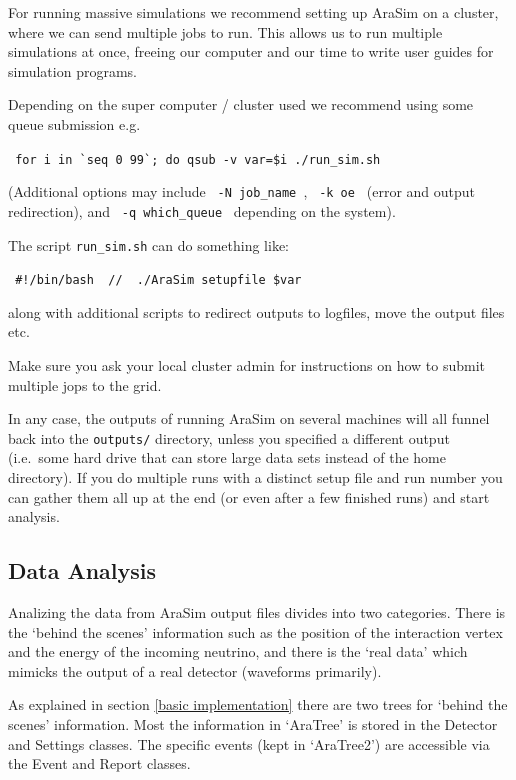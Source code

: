 \documentclass[a4paper,10pt]{article}
\newcommand{\room}{\vspace{0.3cm}}
\newcommand{\arasim}{AraSim\xspace}
\begin{document}
For running massive simulations we recommend setting up \arasim on a cluster, where we can send multiple jobs to run. This allows us to run multiple simulations at once, freeing our computer and our time to write user guides for simulation programs. 

Depending on the super computer / cluster used we recommend using some queue submission e.g.

\verb| for i in `seq 0 99`; do qsub -v var=$i ./run_sim.sh | 

(Additional options may include \verb| -N job_name |, \verb| -k oe | (error and output redirection), and \verb| -q which_queue |  depending on the system). 

\room

The script \verb|run_sim.sh| can do something like:

\verb| #!/bin/bash  //  ./AraSim setupfile $var | 

along with additional scripts to redirect outputs to logfiles, move the output files etc. 


Make sure you ask your local cluster admin for instructions on how to submit multiple jops to the grid. 

\room

In any case, the outputs of running \arasim on several machines will all funnel back into the \verb|outputs/| directory, unless you specified a different output (i.e.~some hard drive that can store large data sets instead of the home directory). If you do multiple runs with a distinct setup file and run number you can gather them all up at the end (or even after a few finished runs) and start analysis. 


\room

\subsection{Data Analysis}

Analizing the data from \arasim output files divides into two categories. There is the `behind the scenes' information such as the position of the interaction vertex and the energy of the incoming neutrino, and there is the `real data' which mimicks the output of a real detector (waveforms primarily). 

\room

As explained in section \ref{basic implementation} there are two trees for `behind the scenes' information. Most the information in `AraTree' is stored in the Detector and Settings classes. The specific events (kept in `AraTree2') are accessible via the Event and Report classes. 
\end{document}
